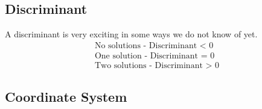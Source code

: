 \subsection*{Discriminant}

A discriminant is very exciting in some ways we do not know of yet.
\begin{align*}
    \text{No solutions - Discriminant < 0}    \\
    \text{One solution - Discriminant = 0}    \\
    \text{Two solutions - Discriminant > 0}       
\end{align*}





\subsection*{Coordinate System}

